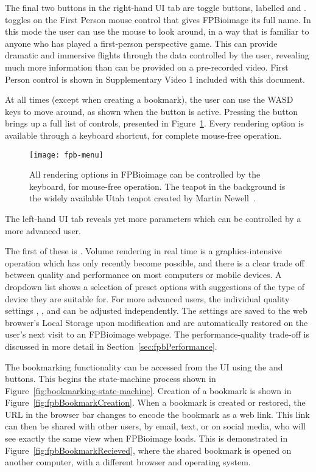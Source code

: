 The final two buttons in the right-hand UI tab are toggle buttons, labelled  and .
 toggles on the First Person mouse control that gives FPBioimage its full name.
In this mode the user can use the mouse to look around, in a way that is familiar to anyone who has played a first-person perspective game.
This can provide dramatic and immersive flights through the data controlled by the user, revealing much more information than can be provided on a pre-recorded video.
First Person control is shown in Supplementary Video 1 included with this document.

At all times (except when creating a bookmark), the user can use the WASD keys to move around, as shown when the  button is active.
Pressing the  button brings up a full list of controls, presented in Figure~\ref{fig:fpbMenu}.
Every rendering option is available through a keyboard shortcut, for complete mouse-free operation.

\begin{figure}[tbp!]
\centering
\texttt{[image: fpb-menu]}
\caption[FPBioimage: Keyboard controls allow FPBioimage to be used without a mouse]{All rendering options in FPBioimage can be controlled by the keyboard, for mouse-free operation. The teapot in the background is the widely available Utah teapot created by Martin Newell~\cite{torrence2006martin}. }
\label{fig:fpbMenu}
\end{figure}

The left-hand UI tab reveals yet more parameters which can be controlled by a more advanced user.

The first of these is .
Volume rendering in real time is a graphics-intensive operation which has only recently become possible, and there is a clear trade off between quality and performance on most computers or mobile devices.
A dropdown list shows a selection of preset options with suggestions of the type of device they are suitable for.
For more advanced users, the individual quality settings , , and  can be adjusted independently.
The  settings are saved to the web browser's Local Storage upon modification and are automatically restored on the user's next visit to an FPBioimage webpage.
The performance-quality trade-off is discussed in more detail in Section~\ref{sec:fpbPerformance}.

The bookmarking functionality can be accessed from the UI using the  and  buttons.
This begins the state-machine process shown in Figure~\ref{fig:bookmarking-state-machine}.
Creation of a bookmark is shown in Figure~\ref{fig:fpbBookmarkCreation}.
When a bookmark is created or restored, the URL in the browser bar changes to encode the bookmark as a web link.
This link can then be shared with other users, by email, text, or on social media, who will see exactly the same view when FPBioimage loads.
This is demonstrated in Figure~\ref{fig:fpbBookmarkRecieved}, where the shared bookmark is opened on another computer, with a different browser and operating system.

